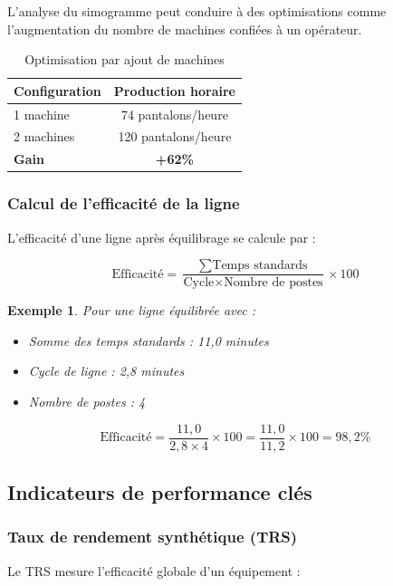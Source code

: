 \documentclass[a4paper,12pt]{article}
\newtheorem{exemple}{Exemple}[section]
\begin{document}
L'analyse du simogramme peut conduire à des optimisations comme l'augmentation du nombre de machines confiées à un opérateur.

\begin{table}[ht]
\centering
\begin{tabular}{|l|c|}
\hline
\textbf{Configuration} & \textbf{Production horaire} \\
\hline
1 machine & 74 pantalons/heure \\
2 machines & 120 pantalons/heure \\
\hline
\textbf{Gain} & \textbf{+62\%} \\
\hline
\end{tabular}
\caption{Optimisation par ajout de machines}
\end{table}

\subsubsection{Calcul de l'efficacité de la ligne}

L'efficacité d'une ligne après équilibrage se calcule par :

\[
\text{Efficacité} = \frac{\sum \text{Temps standards}}{\text{Cycle} \times \text{Nombre de postes}} \times 100
\]

\begin{exemple}
Pour une ligne équilibrée avec :
\begin{itemize}
    \item Somme des temps standards : 11,0 minutes
    \item Cycle de ligne : 2,8 minutes
    \item Nombre de postes : 4
\end{itemize}

\[
\text{Efficacité} = \frac{11,0}{2,8 \times 4} \times 100 = \frac{11,0}{11,2} \times 100 = 98,2\%
\]
\end{exemple}

\subsection{Indicateurs de performance clés}

\subsubsection{Taux de rendement synthétique (TRS)}

Le TRS mesure l'efficacité globale d'un équipement :
\end{document}
